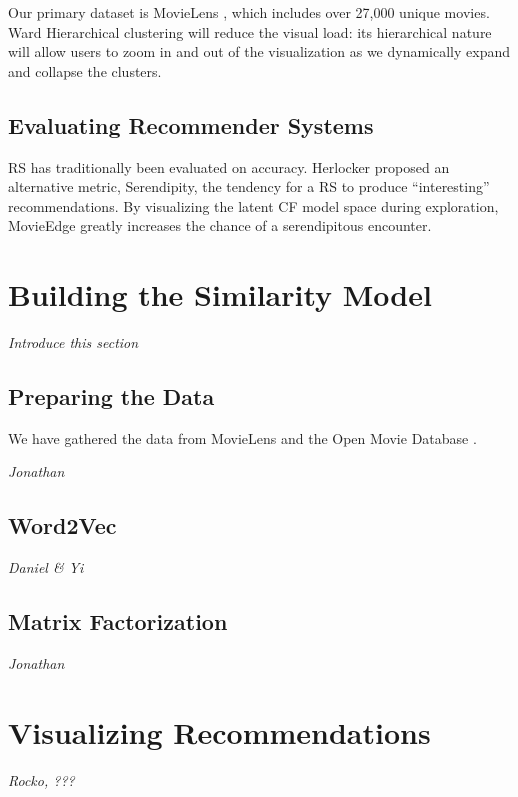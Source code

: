 \documentclass[sigchi, 12pt, nonacm=true, timestamp=true, screen=true]{acmart}
\begin{document}
Our primary dataset is MovieLens \cite{harper2016movielens}, which includes over 27,000 unique movies. Ward Hierarchical clustering \cite{ward1963hierarchical} will reduce the visual load:  its hierarchical nature will allow users to zoom in and out of the visualization as we dynamically expand and collapse the clusters.

\subsection{Evaluating Recommender Systems}

RS has traditionally been evaluated on accuracy. Herlocker \cite{herlocker2004evaluating} proposed an alternative metric, Serendipity, the tendency for a RS to produce  “interesting” recommendations. By visualizing the latent CF model space during exploration, MovieEdge greatly increases the chance of a serendipitous encounter.

\section{Building the Similarity Model}

\textit{Introduce this section}

\subsection{Preparing the Data}

We have gathered the data from MovieLens \cite{harper2016movielens} and the Open Movie Database \cite{openMovieDB}. 

\textit{Jonathan}

\subsection{Word2Vec}

\textit{Daniel \& Yi}

\subsection{Matrix Factorization}

\textit{Jonathan}

\section{Visualizing Recommendations}

\textit{Rocko, ???}
\end{document}
